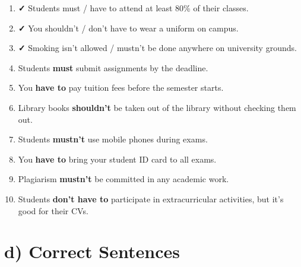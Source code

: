 \documentclass[12pt]{article}
\begin{document}
\begin{enumerate}[label=\arabic*.]
    \item \textbf{✓} Students must / have to attend at least 80\% of their classes.
    
    \item \textbf{✓} You shouldn't / don't have to wear a uniform on campus.
    
    \item \textbf{✓} Smoking isn't allowed / mustn't be done anywhere on university grounds.
    
    \item Students \textbf{must} submit assignments by the deadline.
    
    \item You \textbf{have to} pay tuition fees before the semester starts.
    
    \item Library books \textbf{shouldn't} be taken out of the library without checking them out.
    
    \item Students \textbf{mustn’t} use mobile phones during exams.
    
    \item You \textbf{have to} bring your student ID card to all exams.
    
    \item Plagiarism \textbf{mustn't} be committed in any academic work.
    
    \item Students \textbf{don't have to} participate in extracurricular activities, but it's good for their CVs.
\end{enumerate}

\section*{d) Correct Sentences}
\end{document}
